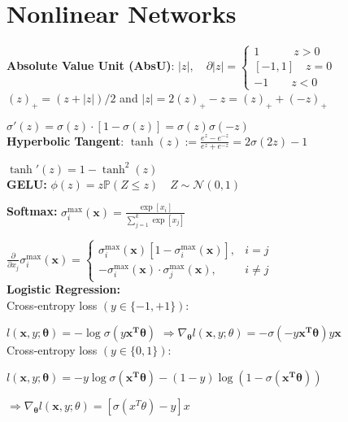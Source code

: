 \section*{Nonlinear Networks}
\color{black}

\vspace{-8pt}

\textbf{Absolute Value Unit (AbsU)}: $|z|, \quad \partial |z|=\begin{cases}  1 \quad\quad\quad z>0 \\ [-1,1] \quad z=0 \\ -1 \quad\quad z<0  \end{cases}$\\[-4pt]

\hfill $(z)_+=(z+|z|)/2$ and $|z|=2(z)_+-z=(z)_++(-z)_+$\\


\hfill $\sigma'(z)=\sigma(z)\cdot [1-\sigma(z)]=\sigma(z)\sigma(-z)$\\
\textbf{Hyperbolic Tangent}: $\tanh (z):=\frac{e^z-e^{-z}}{e^z+e^{-z}}=2\sigma(2z)-1$

\hfill $\tanh' (z)=1-\tanh^2(z)$\\[-2pt]
\textbf{GELU: } $\phi(z) = z \mathbb{P}(Z \leq z) \quad Z \sim \mathcal{N}(0,1)$

\textbf{Softmax:}
$\sigma_i^{\max}(\mathbf{x})=\frac{\exp[{x}_i]}{\sum_{j=1}^k\exp[{x}_j]}$

\hfill $\frac{\partial}{\partial x_j}\sigma^{\max}_i(\mathbf{x})= \begin{cases}\sigma_i^{\max}(\mathbf{x})[1-\sigma_i^{\max}(\mathbf{x})], & i=j \\ -\sigma_i^{\max}(\mathbf{x}) \cdot \sigma_j^{\max} (\mathbf{x}), & i\neq j
\end{cases}$\\[-5pt]

\textbf{Logistic Regression:}\\
Cross-entropy loss $(y\in\{-1,+1\})$:

\hspace{10pt} $l(\mathbf x, y; \mathbf\theta)=-\log\sigma(y\mathbf{x^T \theta})$ $\Rightarrow \nabla_{\mathbf\theta}l(\mathbf x,y; \theta)=-\sigma(-y\mathbf{x^T\theta})y\mathbf x$\\
Cross-entropy loss $(y\in\{0,1\})$: 

\hspace{10pt} $l(\mathbf x, y; \mathbf\theta)=-y\log\sigma(\mathbf{x^T\theta})-(1-y)\log(1-\sigma(\mathbf{x^T\theta}))$

\hfill $\Rightarrow \nabla_{\mathbf\theta}l(\mathbf x,y; \theta)=[\sigma(x^T \theta) - y] x$

\color{red}